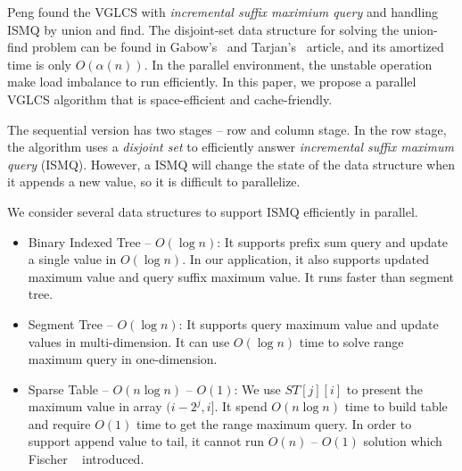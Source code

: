 Peng found the VGLCS with {\em incremental suffix maximium query}
and handling ISMQ by union and find.  The disjoint-set data structure
for solving the union-find problem can be found in
Gabow's~\cite{Gabow1983ALA} and Tarjan's~\cite{Tarjan1975EfficiencyOA}
article, and its amortized time is only $O(\alpha(n))$.  In the parallel
environment, the unstable operation make load imbalance to run
efficiently.  In this paper, we propose a parallel VGLCS algorithm that
is space-efficient and cache-friendly.  

The sequential version has two stages -- row and column stage.  In the
row stage, the algorithm uses a {\em disjoint set} to efficiently answer
{\em incremental suffix maximum query} (ISMQ).  However, a ISMQ will
change the state of the data structure when it appends a new value, so
it is difficult to parallelize.


\iffalse 這裡我們傾向空間複雜度常數小且針對快取友善設計算法。平行算法主
要分成兩個階段－縱向和橫向階段，縱向階段為數個列的後綴極值查找，橫向階
段在行上運行 $n$ 個元素和 $n$ 組詢問。在橫向階段，我們需要解決增長後綴
最大值查找 (\emph{incremental suffix maximum query}, ISMQ)易於實作的并
查集支持單一操作 $O(\alpha(n))$。然而，在過程中每插入一個元素便改動數據
結構以支持下一個後綴詢問，這部分使得查詢難以平行化。為消除資料相依性，
我們找到幾種區間詢問的替代方案。如：\fi

We consider several data structures to support ISMQ efficiently in
parallel.

\begin{itemize}
  \item Binary Indexed Tree\cite{Fenwick1994AND} -- $O(\log n)$: It
    supports prefix sum query and update a single value in $O(\log
    n)$.  In our application, it also supports updated maximum value
    and query suffix maximum value.  It runs faster than segment tree.
  \item Segment Tree\cite{berg2000computational} -- $O(\log n)$: It
    supports query maximum value and update values in multi-dimension.
    It can use $O(\log n)$ time to solve range maximum query in
    one-dimension.
  \item Sparse Table\cite{Berkman1993RecursiveSP} -- $O(n \log n)$ --
    $O(1)$: We use $ST[j][i]$ to present the maximum value in array
    $(i-2^j,i]$.  It spend $O(n \log n)$ time to build table and
    require $O(1)$ time to get the range maximum query. In order to
    support append value to tail, it cannot run $O(n)$ -- $O(1)$
    solution which Fischer ~\cite{Fischer2006TheoreticalAP}
    introduced.
\end{itemize}

